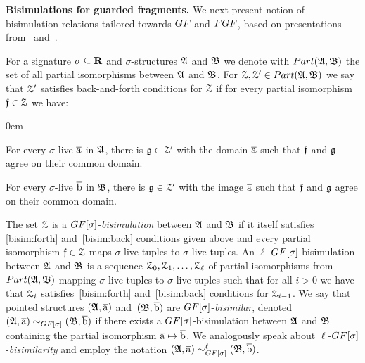 \noindent \textbf{Bisimulations for guarded fragments.}
%
We next present notion of bisimulation relations tailored towards $\GF$ and $\FGF$, based on presentations from~\cite[Sec. 2.2.3]{Otto04} and~\cite[Sec. 2]{BednarczykJ22}.

For a signature $\sigma \subseteq \mathbf{R}$ and $\sigma$-structures ${\mathfrak{A}}$ and ${\mathfrak{B}}$ we denote with $\PartIso{\str{A}}{\str{B}}$ the set of all partial isomorphisms between ${\mathfrak{A}}$ and ${\mathfrak{B}}$. 
For $\bisimZ, \bisimZ' \in \PartIso{\str{A}}{\str{B}}$ we say that $\mathcal{Z}'$ satisfies back-and-forth conditions for $\mathcal{Z}$ if for every partial isomorphism $\mathfrak{f} \in \mathcal{Z}$ we have:
%
\begin{description}\itemsep0em
  \item[\desclabel{(Forth)}{bisim:forth}] For every $\sigma$-live $\overline{\mathrm{a}}$ in ${\mathfrak{A}}$, there is $\mathfrak{g} \in \mathcal{Z}'$ with the domain $\overline{\mathrm{a}}$ such that $\mathfrak{f}$ and $\mathfrak{g}$ agree on their common domain. 
  \item[\desclabel{(Back)}{bisim:back}] For every $\sigma$-live $\overline{\mathrm{b}}$ in ${\mathfrak{B}}$, there is $\mathfrak{g} \in \mathcal{Z}'$ with the image $\overline{\mathrm{a}}$ such that $\mathfrak{f}$ and $\mathfrak{g}$ agree on their common domain. 
\end{description}
The set $\mathcal{Z}$ is a $\GF[\sigma]$-\emph{bisimulation} between ${\mathfrak{A}}$ and ${\mathfrak{B}}$ if it itself satisfies \ref{bisim:forth} and~\ref{bisim:back} conditions given above and every partial isomorphism $\mathfrak{f} \in \mathcal{Z}$ maps $\sigma$-live tuples to $\sigma$-live tuples.
An $\ell$-$\GF[\sigma]$-bisimulation between ${\mathfrak{A}}$ and ${\mathfrak{B}}$ is a sequence $\mathcal{Z}_0, \mathcal{Z}_1, \ldots, \mathcal{Z}_\ell$ of partial isomorphisms from $\PartIso{\str{A}}{\str{B}}$ mapping $\sigma$-live tuples to $\sigma$-live tuples  such that for all $i > 0$ we have that $\mathcal{Z}_i$ satisfies~\ref{bisim:forth} and~\ref{bisim:back} conditions for $\mathcal{Z}_{i{-}1}$.
We say that pointed structures $({\mathfrak{A}}, \overline{\mathrm{a}})$ and~$({\mathfrak{B}}, \overline{\mathrm{b}})$ are $\GF[\sigma]$-\emph{bisimilar}, denoted $(\str{A}, \elemtuplea) \bisimto_{\GF[\sigma]} (\str{B}, \elemtupleb)$ if there exists a $\GF[\sigma]$-bisimulation  between ${\mathfrak{A}}$ and ${\mathfrak{B}}$ containing the partial isomorphism $\overline{\mathrm{a}} \mapsto \overline{\mathrm{b}}$.
We analogously speak about $\ell$-$\GF[\sigma]$-\emph{bisimilarity} and employ the notation $(\str{A}, \elemtuplea) \bisimto_{\GF[\sigma]}^{\ell} (\str{B}, \elemtupleb)$.

